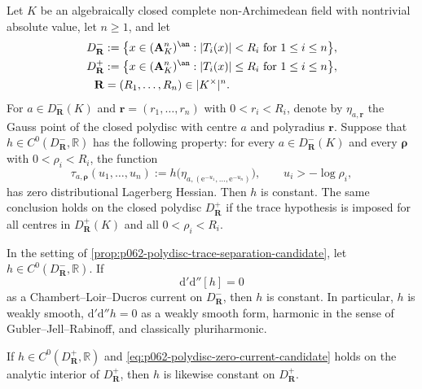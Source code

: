 
\begin{proposition}\label{prop:p062-polydisc-trace-separation-candidate}
Let \(K\) be an algebraically closed complete non-Archimedean field with
nontrivial absolute value, let \(n\geq 1\), and let
\[
 \begin{aligned}
 D^-_{\mathbf R}
 &:=\bigl\{x\in (\mathbf A^n_K)^{\an}:|T_i(x)|<R_i
       \text{ for }1\leq i\leq n\bigr\},\\
 D^+_{\mathbf R}
 &:=\bigl\{x\in (\mathbf A^n_K)^{\an}:|T_i(x)|\leq R_i
       \text{ for }1\leq i\leq n\bigr\},\\
 \mathbf R&=(R_1,\ldots,R_n)\in |K^\times|^n.
 \end{aligned}
\]
For \(a\in D^-_{\mathbf R}(K)\) and
\(\mathbf r=(r_1,\ldots,r_n)\) with \(0<r_i<R_i\), denote by
\(\eta_{a,\mathbf r}\) the Gauss point of the closed polydisc with centre
\(a\) and polyradius \(\mathbf r\). Suppose that
\(h\in C^0(D^-_{\mathbf R},\mathbb R)\) has the following property: for
every \(a\in D^-_{\mathbf R}(K)\) and every
\(\boldsymbol\rho\) with \(0<\rho_i<R_i\), the function
\begin{equation}\label{eq:p062-polydisc-radial-trace-candidate}
 \tau_{a,\boldsymbol\rho}(u_1,\ldots,u_n)
 :=h\bigl(\eta_{a,(\mathrm e^{-u_1},\ldots,
                         \mathrm e^{-u_n})}\bigr),
 \qquad u_i>-\log\rho_i,
\end{equation}
has zero distributional Lagerberg Hessian. Then \(h\) is constant.
The same conclusion holds on the closed polydisc \(D^+_{\mathbf R}\) if
the trace hypothesis is imposed for all centres in
\(D^+_{\mathbf R}(K)\) and all \(0<\rho_i<R_i\).
\end{proposition}

\begin{theorem}\label{thm:p062-polydisc-zero-current-candidate}
In the setting of \cref{prop:p062-polydisc-trace-separation-candidate},
let \(h\in C^0(D^-_{\mathbf R},\mathbb R)\). If
\begin{equation}\label{eq:p062-polydisc-zero-current-candidate}
             \mathrm d'\mathrm d''[h]=0
\end{equation}
as a Chambert--Loir--Ducros current on \(D^-_{\mathbf R}\), then \(h\)
is constant. In particular, \(h\) is weakly smooth,
\(\mathrm d'\mathrm d''h=0\) as a weakly smooth form, harmonic in the
sense of Gubler--Jell--Rabinoff, and classically pluriharmonic.

If \(h\in C^0(D^+_{\mathbf R},\mathbb R)\) and
\eqref{eq:p062-polydisc-zero-current-candidate} holds on the analytic
interior of \(D^+_{\mathbf R}\), then \(h\) is likewise constant on
\(D^+_{\mathbf R}\).
\end{theorem}
